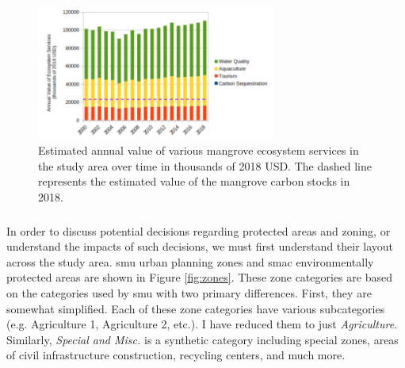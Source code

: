 \begin{figure}[!htb] 
\centering
\includegraphics[width=0.7\textwidth]{Figures/chap4/annual_ecosystem_services.png}
\caption[Annual Value of Mangrove Ecosystem Services]{Estimated annual value of various mangrove ecosystem services in the study area over time in thousands of 2018 USD. The dashed line represents the estimated value of the mangrove carbon stocks in 2018.}
\label{fig:annual_ecosystem_services}
\end{figure}


\subsubsection{} 

In order to discuss potential decisions regarding protected areas and zoning, or understand the impacts of such decisions, we must first understand their layout across the study area. \ac{smu} urban planning zones \cite{institutopereirapassosAreasProtegidas2021} and \ac{smac} environmentally protected areas \cite{institutopereirapassosSetores2022} are shown in Figure \ref{fig:zones}. These zone categories are based on the categories used by \ac{smu} with two primary differences. First, they are somewhat simplified. Each of these zone categories have various subcategories (e.g. Agriculture 1, Agriculture 2, etc.). I have reduced them to just \textit{Agriculture}. Similarly, \textit{Special and Misc.} is a synthetic category including special zones, areas of civil infrastructure construction, recycling centers, and much more. 

